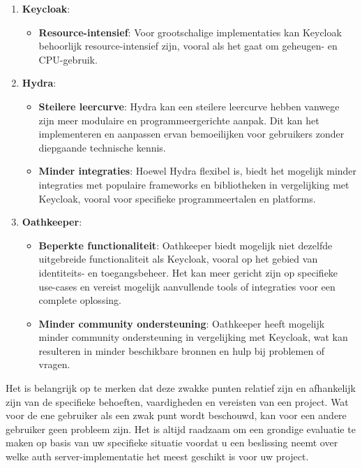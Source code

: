 \begin{enumerate}[label=\textbf{\arabic*.}]
    \item \textbf{Keycloak}:
    \begin{itemize}
        \item \textbf{Resource-intensief}: Voor grootschalige implementaties kan Keycloak behoorlijk resource-intensief zijn, vooral als het gaat om geheugen- en CPU-gebruik.
    \end{itemize}

    \item \textbf{Hydra}:
    \begin{itemize}
        \item \textbf{Steilere leercurve}: Hydra kan een steilere leercurve hebben vanwege zijn meer modulaire en programmeergerichte aanpak. Dit kan het implementeren en aanpassen ervan bemoeilijken voor gebruikers zonder diepgaande technische kennis.
        \item \textbf{Minder integraties}: Hoewel Hydra flexibel is, biedt het mogelijk minder integraties met populaire frameworks en bibliotheken in vergelijking met Keycloak, vooral voor specifieke programmeertalen en platforms.
    \end{itemize}
    
    \item \textbf{Oathkeeper}:
    \begin{itemize}
        \item \textbf{Beperkte functionaliteit}: Oathkeeper biedt mogelijk niet dezelfde uitgebreide functionaliteit als Keycloak, vooral op het gebied van identiteits- en toegangsbeheer. Het kan meer gericht zijn op specifieke use-cases en vereist mogelijk aanvullende tools of integraties voor een complete oplossing.
        \item \textbf{Minder community ondersteuning}: Oathkeeper heeft mogelijk minder community ondersteuning in vergelijking met Keycloak, wat kan resulteren in minder beschikbare bronnen en hulp bij problemen of vragen.
    \end{itemize}
\end{enumerate}

Het is belangrijk op te merken dat deze zwakke punten relatief zijn en afhankelijk zijn van de specifieke behoeften, vaardigheden en vereisten van een project. Wat voor de ene gebruiker als een zwak punt wordt beschouwd, kan voor een andere gebruiker geen probleem zijn. Het is altijd raadzaam om een grondige evaluatie te maken op basis van uw specifieke situatie voordat u een beslissing neemt over welke auth server-implementatie het meest geschikt is voor uw project.

